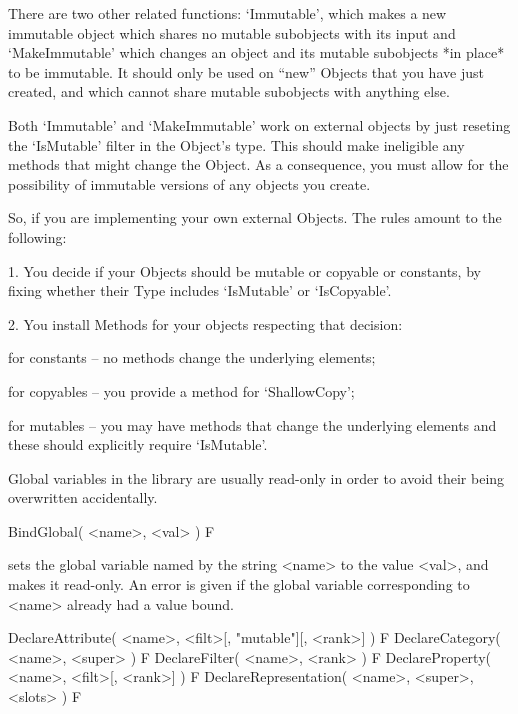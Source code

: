 There are two other related functions: `Immutable', which makes a new
immutable object which shares no mutable subobjects with its input and
`MakeImmutable' which changes an object and its mutable subobjects *in
place* to be immutable. It should only be used on ``new'' Objects that
you have just created, and which cannot share mutable subobjects with
anything else.

Both `Immutable' and `MakeImmutable' work on external objects by just
reseting the `IsMutable' filter in the Object's type. This should make
ineligible any methods that might change the Object. As a consequence,
you must allow for the possibility of immutable versions of any
objects you create.

So, if you are implementing your own external Objects. The rules amount to the
following:

\beginlist

\item{1.}
You decide if your Objects should be mutable or copyable or constants, by
fixing whether their Type includes `IsMutable' or `IsCopyable'.

\item{2.}
You install Methods for your objects respecting that decision:

\itemitem{$\bullet$}
for constants -- no methods change the underlying elements;

\itemitem{$\bullet$}
for copyables -- you provide a method for `ShallowCopy';

\itemitem{$\bullet$}
for mutables  -- you may have methods that change the underlying elements
and these should explicitly require `IsMutable'.

\endlist


Global variables in the {\GAP} library are usually read-only in order to
avoid their being overwritten accidentally.

\>BindGlobal( <name>, <val> ) F

sets the global variable named by the string <name> to the value <val>,
and makes it read-only.
An error is given if the global variable corresponding to <name>
already had a value bound.

\>DeclareAttribute( <name>, <filt>[, "mutable"][, <rank>] ) F
\>DeclareCategory( <name>, <super> ) F
\>DeclareFilter( <name>, <rank> ) F
\>DeclareProperty( <name>, <filt>[, <rank>] ) F
\>DeclareRepresentation( <name>, <super>, <slots> ) F

